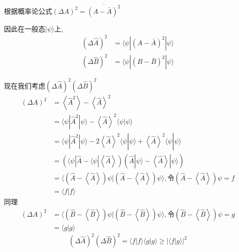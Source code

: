 \documentclass[lang=cn,15pt]{elegantbook}
\begin{document}
根据概率论公式\quad $(\varDelta A)^2=\overline{(A-\bar{A})^2}$

因此在一般态$|\psi\rangle$上,
\begin{equation*}
	\begin{split}
		\left( \varDelta \hat{A} \right) ^2&=\langle \psi |(A-\bar{A})^2|\psi \rangle 
		\\
		\left( \varDelta \hat{B} \right) ^2&=\langle \psi |(B-\bar{B})^2|\psi \rangle 
	\end{split}
\end{equation*}

现在我们考虑$\left( \varDelta \hat{A} \right) ^2\left( \varDelta \hat{B} \right) ^2$
\begin{equation*}
	\begin{split}
		\left( \varDelta A \right) ^2&=\left< \hat{A}^2 \right> -\left< \hat{A} \right> ^2
		\\
		&=\langle \psi |\hat{A}^2|\psi \rangle -\left< \hat{A} \right> ^2\langle \psi |\psi \rangle 
		\\
		&=\langle \psi |\hat{A}^2|\psi \rangle -2\left< \hat{A} \right> ^2\langle \psi |\psi \rangle +\left< \hat{A} \right> ^2\langle \psi |\psi \rangle 
		\\
		&=\left( \langle \psi |\hat{A}-\langle \psi |\left< \hat{A} \right> \right) \left( \hat{A}|\psi \rangle -\left< \hat{A} \right> |\psi \rangle \right) 
		\\
		&=\langle \left( \hat{A}-\left< \hat{A} \right> \right) \psi |\left( \hat{A}-\left< \hat{A} \right> \right) \psi \rangle ,\text{令}\left( \hat{A}-\left< \hat{A} \right> \right) \psi =f
		\\
		&=\langle f|f\rangle 
	\end{split}
\end{equation*}
同理
\begin{equation*}
	\begin{split}
		\left( \varDelta A \right) ^2&=\langle \left( \hat{B}-\left< \hat{B} \right> \right) \psi |\left( \hat{B}-\left< \hat{B} \right> \right) \psi \rangle ,\text{令}\left( \hat{B}-\left< \hat{B} \right> \right) \psi =g
		\\
		&=\langle g|g\rangle 
	\end{split}
\end{equation*}
\begin{equation*}
	\left( \varDelta \hat{A} \right) ^2\left( \varDelta \hat{B} \right) ^2=\langle f|f\rangle \langle g|g\rangle \ge |\langle f|g\rangle |^2
\end{equation*}
\end{document}
